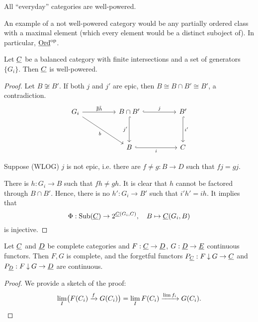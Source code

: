 \begin{examples*}
	\item All \enquote{everyday} categories are well-powered.
	\item An example of a not well-powered category would be any partially ordered class with a maximal element (which every element would be a distinct suboject of). In particular, \( \underline{\mathrm{Ord}}^\mathrm{op} \).
\end{examples*}

\begin{theorem*}[Electrification]
	Let \( \underline{C} \) be a balanced category with finite intersections and a set of generators \( \{G_i\} \). Then \( \underline{C} \) is well-powered.
\end{theorem*}
\begin{proof}
	Let \( B \not\cong B' \). If both \( j \) and \( j' \) are epic, then \( B \cong B \cap B' \cong B' \), a contradiction.
	\[
		\begin{tikzcd}{G_i} && {B \cap B'} && {B'} \\
			\\
			&& B && C
			\arrow["{\nexists \tilde{h}}", from=1-1, to=1-3]
			\arrow["b"', from=1-1, to=3-3]
			\arrow["j", hook, from=1-3, to=1-5]
			\arrow["{j'}"', hook, from=1-3, to=3-3]
			\arrow["{i'}", hook, from=1-5, to=3-5]
			\arrow["i"', hook, from=3-3, to=3-5]
		\end{tikzcd}
	\]

	Suppose (WLOG) \( j \) is not epic, i.e. there are \( f \neq g: B \to D \) such that \( fj = gj \).

	\vspace*{2mm}

	There is \( h: G_i \to B \) such that \( fh \neq gh \). It is clear that \( h \) cannot be factored through \( B \cap B' \). Hence, there is no \( h': G_i \to B' \) such that \( i' h' = ih \). It implies that
	\[
		\Phi: \operatorname{Sub}(\underline{C}) \to 2^{\underline{C}(G_i, C)}, \quad B \mapsto \underline{C}(G_i, B)
	\]
	is injective.
\end{proof}

\begin{lemma*}
	Let \( \underline{C} \) and \( \underline{D} \) be complete categories and \( F: \underline{C} \to \underline{D} \), \( G: \underline{D} \to \underline{E} \) continuous functors. Then \( F \comma G \) is complete, and the forgetful functors \( P_{\underline{C}}: F \mathbin{\downarrow} G \to \underline{C} \) and \( P_{\underline{D}}: F \mathbin{\downarrow} G \to \underline{D} \) are continuous.
\end{lemma*}
\begin{proof}
	We provide a sketch of the proof:
	\[
		\lim_I\bigl(F(C_i) \xrightarrow{f} G(C_i)\bigr) = \lim_I F(C_i) \xrightarrow{\lim f_i} G(C_i).
	\]
\end{proof}

